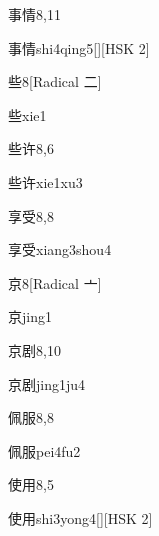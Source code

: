 \begin{entry}{事情}{8,11}
  \begin{phonetics}{事情}{shi4qing5}[][HSK 2]
  \end{phonetics}
\end{entry}

\begin{entry}{些}{8}[Radical 二]
  \begin{phonetics}{些}{xie1}
  \end{phonetics}
\end{entry}

\begin{entry}{些许}{8,6}
  \begin{phonetics}{些许}{xie1xu3}
  \end{phonetics}
\end{entry}

\begin{entry}{享受}{8,8}
  \begin{phonetics}{享受}{xiang3shou4}
  \end{phonetics}
\end{entry}

\begin{entry}{京}{8}[Radical 亠]
  \begin{phonetics}{京}{jing1}
  \end{phonetics}
\end{entry}

\begin{entry}{京剧}{8,10}
  \begin{phonetics}{京剧}{jing1ju4}
  \end{phonetics}
\end{entry}

\begin{entry}{佩服}{8,8}
  \begin{phonetics}{佩服}{pei4fu2}
  \end{phonetics}
\end{entry}

\begin{entry}{使用}{8,5}
  \begin{phonetics}{使用}{shi3yong4}[][HSK 2]
  \end{phonetics}
\end{entry}

